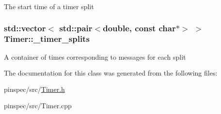 The start time of a timer split \hypertarget{classTimer_a92ba53954cd01cbd9afe2e397e529d35}{
\subsubsection[{\-\_\-timer\-\_\-splits}]{\setlength{\rightskip}{0pt plus 5cm}std\-::vector$<$ std\-::pair$<$double, const char$\ast$$>$ $>$ Timer\-::\-\_\-timer\-\_\-splits\hspace{0.3cm}{\ttfamily [protected]}}}\label{classTimer_a92ba53954cd01cbd9afe2e397e529d35}
A container of times corresponding to messages for each split 

The documentation for this class was generated from the following files\-:\begin{DoxyCompactItemize}
\item 
pinspec/src/\hyperlink{Timer_8h}{Timer.\-h}\item 
pinspec/src/Timer.\-cpp\end{DoxyCompactItemize}

